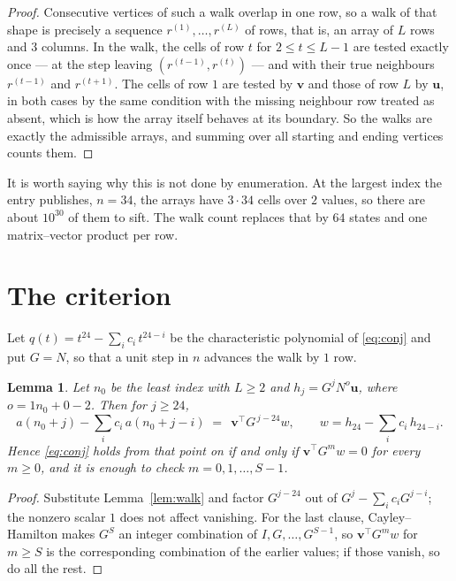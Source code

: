 \documentclass[11pt,a4paper]{article}
\theoremstyle{plain}
\newtheorem{lemma}[theorem]{Lemma}
\theoremstyle{definition}
\begin{document}
\begin{proof}
Consecutive vertices of such a walk overlap in one row, so a walk of that shape is
precisely a sequence $r^{(1)},\dots,r^{(L)}$ of rows, that is, an array of $L$ rows
and $3$ columns. In the walk, the cells of row $t$ for $2\le t\le L-1$ are tested
exactly once --- at the step leaving $(r^{(t-1)},r^{(t)})$ --- and with their true
neighbours $r^{(t-1)}$ and $r^{(t+1)}$. The cells of row $1$ are tested by
$\mathbf{v}$ and those of row $L$ by $\mathbf{u}$, in both cases by the same condition
with the missing neighbour row treated as absent, which is how the array itself behaves at
its boundary. So the walks are exactly the admissible arrays, and summing over all starting
and ending vertices counts them.
\end{proof}


It is worth saying why this is not done by enumeration. At the largest index the entry
publishes, $n=34$, the arrays have $3\cdot34$ cells over
$2$ values, so there are about $10^{30}$ of them to sift. The
walk count replaces that by $64$ states and one matrix--vector product per row.
\section{The criterion}

Let $q(t)=t^{24}-\sum_i c_i\,t^{24-i}$ be the characteristic polynomial of
\eqref{eq:conj} and put $G=N$, so that a unit step in $n$ advances the walk by
$1$ row.

\begin{lemma}\label{lem:crit}
Let $n_0$ be the least index with $L\ge2$ and $h_j=G^{j}N^{o}\mathbf{u}$, where
$o=1n_0+0-2$. Then for $j\ge24$,
\[
a(n_0+j)-\sum_i c_i\,a(n_0+j-i)\;=\;\,\mathbf{v}^{\!\top}G^{\,j-24}w,
\qquad w=h_{24}-\sum_i c_i\,h_{24-i} .
\]
Hence \eqref{eq:conj} holds from that point on if and only if
$\mathbf{v}^{\!\top}G^{m}w=0$ for every $m\ge0$, and it is enough to check
$m=0,1,\dots,S-1$.
\end{lemma}

\begin{proof}
Substitute Lemma~\ref{lem:walk} and factor $G^{j-24}$ out of
$G^{j}-\sum_ic_iG^{j-i}$; the nonzero scalar $1$ does not affect
vanishing. For the last clause, Cayley--Hamilton makes $G^{S}$ an integer combination of
$I,G,\dots,G^{S-1}$, so $\mathbf{v}^{\!\top}G^{m}w$ for $m\ge S$ is the corresponding
combination of the earlier values; if those vanish, so do all the rest.
\end{proof}
\end{document}
